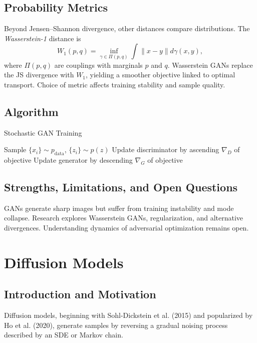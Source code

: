 \documentclass[11pt]{book}
\begin{document}
\subsection{Probability Metrics}
Beyond Jensen--Shannon divergence, other distances compare distributions. The \emph{Wasserstein-1} distance \cite{villani2003} is
\begin{equation}
W_1(p,q)=\inf_{\gamma\in\Pi(p,q)} \int \|x-y\| d\gamma(x,y),
\end{equation}
where $\Pi(p,q)$ are couplings with marginals $p$ and $q$. Wasserstein GANs replace the JS divergence with $W_1$, yielding a smoother objective linked to optimal transport. Choice of metric affects training stability and sample quality.

\subsection{Algorithm}
\begin{algorithm}
\caption{Stochastic GAN Training}
\begin{algorithmic}[1]
    \STATE Sample $\{x_i\}\sim p_{\text{data}}$, $\{z_i\}\sim p(z)$
    \STATE Update discriminator by ascending $\nabla_D$ of objective
    \STATE Update generator by descending $\nabla_G$ of objective
\ENDFOR
\end{algorithmic}
\end{algorithm}

\subsection{Strengths, Limitations, and Open Questions}
GANs generate sharp images but suffer from training instability and mode collapse. Research explores Wasserstein GANs, regularization, and alternative divergences. Understanding dynamics of adversarial optimization remains open.

\section{Diffusion Models}
\subsection{Introduction and Motivation}
Diffusion models, beginning with Sohl-Dickstein et al. (2015) and popularized by Ho et al. (2020), generate samples by reversing a gradual noising process described by an SDE or Markov chain.
\end{document}
